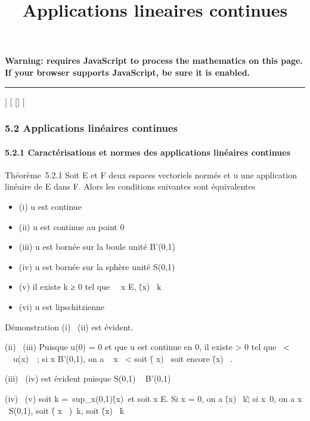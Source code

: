 \documentclass[]{article}
\title{Applications lineaires continues}
\author{}
\date{}
\begin{document}
\maketitle

\textbf{Warning: 
requires JavaScript to process the mathematics on this page.\\ If your
browser supports JavaScript, be sure it is enabled.}

\begin{center}\rule{3in}{0.4pt}\end{center}

[
[
[]
[

\subsubsection{5.2 Applications linéaires continues}

\paragraph{5.2.1 Caractérisations et normes des applications linéaires
continues}

Théorème~5.2.1 Soit E et F deux espaces vectoriels normés et u une
application linéaire de E dans F. Alors les conditions suivantes sont
équivalentes

\begin{itemize}
\itemsep1pt\parskip0pt
\item
  (i) u est continue
\item
  (ii) u est continue au point 0
\item
  (iii) u est bornée sur la boule unité B'(0,1)
\item
  (iv) u est bornée sur la sphère unité S(0,1)
\item
  (v) il existe k ≥ 0 tel que \forall~~x \in E,
  \u(x)\ \leq
  k\x\
\item
  (vi) u est lipschitzienne
\end{itemize}

Démonstration (i) \rigtharrow~(ii) est évident.

(ii) \rigtharrow~(iii) Puisque u(0) = 0 et que u est continue en 0, il existe \eta
> 0 tel que
\x\ < \eta
\rigtharrow~\ u(x)\ ~; si x \in
B'(0,1), on a \ \eta {}
x\ \leq \eta {} < \eta
soit \u( \eta \over 2
x)\  soit encore
\u(x)\ 
\over \eta .

(iii) \rigtharrow~(iv) est évident puisque S(0,1) \subset~ B'(0,1)

(iv) \rigtharrow~(v) soit k =\
sup_x\inS(0,1)\u(x)\
et soit x \in E. Si x = 0, on a
\u(x)\ \leq
k\x\~; si
x\neq~0, on a  x \over
\x\ \in S(0,1), soit
\u( x \over
\x\
)\ \leq k, soit
\u(x)\ \leq
k\x\.
\end{document}
